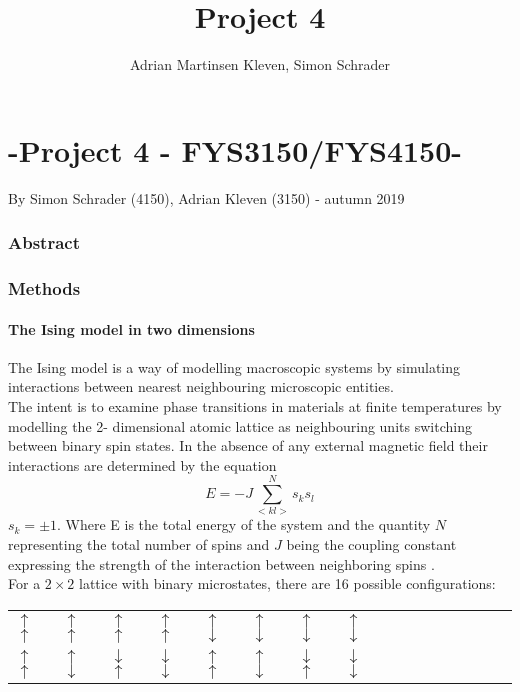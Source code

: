 \documentclass[10pt,a4paper]{article}
\author{Adrian Martinsen Kleven, Simon Schrader}
\title{Project 4}
\begin{document}
\part*{-Project 4 - FYS3150/FYS4150-
}
{\large By Simon Schrader (4150), Adrian Kleven (3150) - autumn 2019
}
\tableofcontents

\listoffigures
\listoftables


\clearpage

\section{Abstract}
\section{Methods}
\subsection{The Ising model in two dimensions}
The Ising model is a way of modelling macroscopic systems by simulating interactions between nearest neighbouring microscopic entities.\\The intent is to examine phase transitions in materials at finite temperatures by modelling the 2- dimensional atomic lattice as neighbouring units switching between  binary spin states. In the absence of any external magnetic field their interactions are determined by the equation
\begin{equation} \label{2d-ising energy}
E=-J\sum_{< kl >}^{N}s_ks_l 
\end{equation}
$s_k=\pm 1$. Where E is the total energy of the system and the quantity $N$ representing the total number of spins and $J$ being the coupling constant expressing the strength of the interaction between
neighboring spins \cite{Lecture_Notes_Fall_2015}.\\For a $2\times2$ lattice with binary microstates, there are 16 possible configurations:
\begin{table}[H]
\begin{tabular}{llllllllllllllll}
 $\uparrow$ $\uparrow$ &  $\uparrow$ $\uparrow$ &  $\uparrow$ $\uparrow$ &  $\uparrow$ $\uparrow$ &  $\uparrow$ $\downarrow$ &  $\uparrow$ $\downarrow$ & $\uparrow$ $\downarrow$ & $\uparrow$ $\downarrow$ \\
 $\uparrow$ $\uparrow$&  $\uparrow$ $\downarrow$ &  $\downarrow$ $\uparrow$ &  $\downarrow$ $\downarrow$ &  $\uparrow$ $\uparrow$ &  $\uparrow$ $\downarrow$ &  $\downarrow$ $\uparrow$ &  $\downarrow$ $\downarrow$
\end{tabular}
\end{table}
\end{document}
